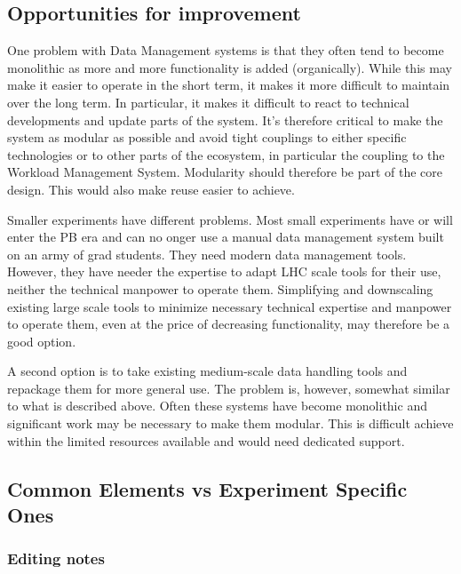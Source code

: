 \subsection{Opportunities for improvement}
One problem with Data Management systems is that they often tend to become monolithic as more and more functionality is 
added (organically). While this may make it easier to operate in the short term, it makes it more difficult to maintain over 
the long term. In particular, it makes it difficult to react to technical developments and update parts of the system. It's 
therefore critical to make the system as modular as possible and avoid tight couplings to either specific technologies or 
to other parts of the ecosystem, in particular the coupling to the Workload Management System. Modularity should therefore be 
part of the core design. This would also make reuse easier to achieve. 
\par Smaller experiments have different problems. Most small experiments have or will enter the PB era and can no onger use a manual 
data management system built on an army of grad students. They need modern data management tools. However, they have needer the 
expertise to adapt LHC scale tools for their use, neither the technical manpower to operate them. Simplifying and downscaling existing 
large scale tools to minimize necessary technical expertise and manpower to operate them, even at the price of decreasing functionality, 
may therefore be a good option. 
\par A second option is to take existing medium-scale data handling tools and repackage them for more general use. The problem is, 
however, somewhat similar to what is described above. Often these systems have become monolithic and significant work may be 
necessary to make them modular. This is difficult achieve within the limited resources available and would need dedicated support.






\subsection{Common Elements vs Experiment Specific Ones}



\subsubsection{Editing notes}



